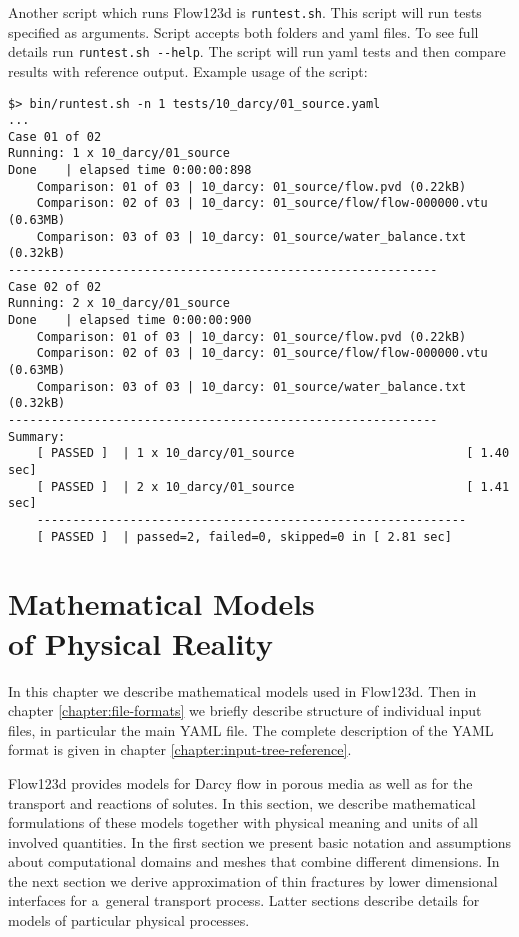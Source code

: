 \documentclass[12pt,a4paper]{report}
\begin{document}
Another script which runs Flow123d is \verb'runtest.sh'. This script will run tests specified as arguments. Script accepts both folders
and yaml files. To see full details run \verb'runtest.sh --help'. The script will run yaml tests and then compare results with reference
output. Example usage of the script:

\begin{verbatim}
$> bin/runtest.sh -n 1 tests/10_darcy/01_source.yaml 
...
Case 01 of 02
Running: 1 x 10_darcy/01_source
Done    | elapsed time 0:00:00:898                                              
    Comparison: 01 of 03 | 10_darcy: 01_source/flow.pvd (0.22kB)
    Comparison: 02 of 03 | 10_darcy: 01_source/flow/flow-000000.vtu (0.63MB)
    Comparison: 03 of 03 | 10_darcy: 01_source/water_balance.txt (0.32kB)
------------------------------------------------------------
Case 02 of 02
Running: 2 x 10_darcy/01_source
Done    | elapsed time 0:00:00:900                                              
    Comparison: 01 of 03 | 10_darcy: 01_source/flow.pvd (0.22kB)
    Comparison: 02 of 03 | 10_darcy: 01_source/flow/flow-000000.vtu (0.63MB)
    Comparison: 03 of 03 | 10_darcy: 01_source/water_balance.txt (0.32kB)
------------------------------------------------------------
Summary: 
    [ PASSED ]  | 1 x 10_darcy/01_source                        [ 1.40 sec] 
    [ PASSED ]  | 2 x 10_darcy/01_source                        [ 1.41 sec] 
    ------------------------------------------------------------
    [ PASSED ]  | passed=2, failed=0, skipped=0 in [ 2.81 sec]

\end{verbatim}










\chapter[Mathematical Models of Physical Reality]{Mathematical Models \\of Physical Reality}
\label{chapter:mathematical_models}

In this chapter we describe mathematical models used in Flow123d.
Then in chapter \ref{chapter:file-formats} we briefly describe structure of individual input files, in particular the main YAML file.
The complete description of the YAML format is given in chapter \ref{chapter:input-tree-reference}.

Flow123d provides models for Darcy flow in porous media as well as for the transport and reactions of solutes. In this section, we describe 
mathematical formulations of these models together with physical meaning and units of all involved quantities. In the first section we present 
basic notation and assumptions about computational domains and meshes that combine different dimensions. In the next section we
derive approximation of thin fractures by lower dimensional interfaces for a~general transport process. Latter sections describe details for models of particular
physical processes.
\end{document}
